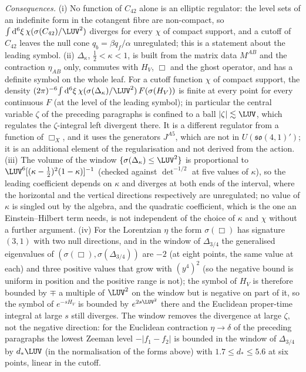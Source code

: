 \emph{Consequences.} (i) No function of \(C_{42}\) alone is an elliptic regulator: the level sets of an indefinite form in the cotangent fibre are non-compact, so \(\int\mathrm d^6\xi\,\chi(\sigma(C_{42})/\LUV^2)\) diverges for every \(\chi\) of compact support, and a cutoff of \(C_{42}\) leaves the null cone \(q_b=\beta q_f/\alpha\) unregulated; this is a statement about the leading symbol. (ii) \(\Delta_\kappa\), \(\tfrac12<\kappa<1\), is built from the matrix data \(M^{AB}\) and the contraction \(\eta_{AB}\) only, commutes with \(H_V\), \(\Box\) and the ghost operator, and has a definite symbol on the whole leaf. For a cutoff function \(\chi\) of compact support, the density \((2\pi)^{-6}\!\int\mathrm d^6\xi\,\chi(\sigma(\Delta_\kappa)/\LUV^2)\,F(\sigma(H_V))\) is finite at every point for every continuous \(F\) (at the level of the leading symbol); in particular the central variable \(\zeta\) of the preceding paragraphs is confined to a ball \(|\zeta|\lesssim\LUV\), which regulates the \(\zeta\)-integral left divergent there. It is a different regulator from a function of \(\Box_X\), and it uses the generators \(J^{A5}\), which are not in \(U(\mathfrak{so}(4,1)')\); it is an additional element of the regularisation and not derived from the action. (iii) The volume of the window \(\{\sigma(\Delta_\kappa)\le\LUV^2\}\) is proportional to \(\LUV^6[(\kappa-\tfrac12)^2(1-\kappa)]^{-1}\) (checked against \(\det^{-1/2}\) at five values of \(\kappa\)), so the leading coefficient depends on \(\kappa\) and diverges at both ends of the interval, where the horizontal and the vertical directions respectively are unregulated; no value of \(\kappa\) is singled out by the algebra, and the quadratic coefficient, which is the one an Einstein--Hilbert term needs, is not independent of the choice of \(\kappa\) and \(\chi\) without a further argument. (iv) For the Lorentzian \(\eta\) the form \(\sigma(\Box)\) has signature \((3,1)\) with two null directions, and in the window of \(\Delta_{3/4}\) the generalised eigenvalues of \((\sigma(\Box),\sigma(\Delta_{3/4}))\) are \(-2\) (at eight points, the same value at each) and three positive values that grow with \((y^4)^2\) (so the negative bound is uniform in position and the positive range is not); the symbol of \(H_V\) is therefore bounded by \(\mp\) a multiple of \(\LUV^2\) on the window but is negative on part of it, so the symbol of \(e^{-sH_V}\) is bounded by \(e^{2s\LUV^2}\) there and the Euclidean proper-time integral at large \(s\) still diverges. The window removes the divergence at large \(\zeta\), not the negative direction: for the Euclidean contraction \(\eta\to\delta\) of the preceding paragraphs the lowest Zeeman level \(-|f_1-f_2|\) is bounded in the window of \(\Delta_{3/4}\) by \(d_*\LUV\) (in the normalisation of the forms above) with \(1.7\le d_*\le5.6\) at six points, linear in the cutoff.

